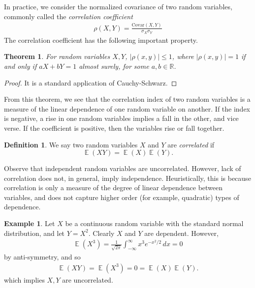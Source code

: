\documentclass[12pt]{amsbook}
\newcommand{\rr}{\mathbb{R}}
\DeclareMathOperator{\ex}{\mathbb{E}}
\newcommand{\covar}{\mathrm{Covar}}
\theoremstyle{plain}
\newtheorem{theorem}{Theorem}
\theoremstyle{definition}
\newtheorem*{definition}{Definition}
\newtheorem*{example}{Example}
\theoremstyle{remark}
\numberwithin{equation}{section}  %
\begin{document}
	In practice, we consider the normalized covariance of two random variables,
	commonly called the \emph{correlation coefficient}
	\begin{align*}
		\rho(X,Y) = \frac{\covar(X,Y)}{\sigma_X \sigma_Y}
	\end{align*}
	The correlation coefficient has the following important property.
	\begin{theorem}
		For random variables $X, Y$, $|\rho(x,y)| \le 1$, where $|\rho(x,y)| = 1$ 
		if and
		only if $aX + bY = 1$ almost surely, for some $a,b \in \rr$. 
	\end{theorem}
	\begin{proof}
		It is a standard application of Cauchy-Schwarz.
	\end{proof}
	From this theorem, we see that the correlation index of two random variables is
	a measure of the linear dependence of one random variable on another. If the
	index is negative, a rise in one random variables implies a fall in the other,
	and vice verse. If the coefficient is positive, then the variables rise or fall
	together.
	\begin{definition}
		We say two random variables $X$ and $Y$ are \emph{correlated} 
		if \[\ex(XY) = \ex(X)\ex(Y).\]
	\end{definition}
	Observe that independent random variables are uncorrelated. However,
	lack of correlation does not, in general, imply independence. Heuristically, 
	this is
	because correlation is only a measure of the degree of linear dependence
	between variables, and does not capture higher order (for example, quadratic)
	types of dependence. 
	\begin{example}
		Let $X$ be a continuous random variable with the standard normal 
		distribution,
		and let $Y = X^2$. Clearly $X$ and $Y$ are dependent. However,
		\begin{align*}
			\ex(X^3) = \frac{1}{\sqrt{2 \pi}}\int_{-\infty}^{\infty} x^3 e^{-x^2/2} 
			\, dx = 0
		\end{align*}
		by anti-symmetry, and so
		\begin{align*}
			\ex(XY) = \ex(X^3) = 0 = \ex(X) \ex(Y).
		\end{align*}
		which implies $X, Y$ are uncorrelated.
	\end{example}
\end{document}
